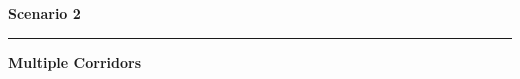 \documentclass{article}
\begin{document}
\centering
\vspace*{\fill}
{\fontsize{44}{52}\selectfont\bfseries Scenario 2\par}
\vspace{8mm}
{\color{accent}\rule{32mm}{0.8mm}\par}
\vspace{10mm}
{\fontsize{40}{48}\selectfont\bfseries Multiple Corridors\par}
\vspace*{\fill}
\end{document}

